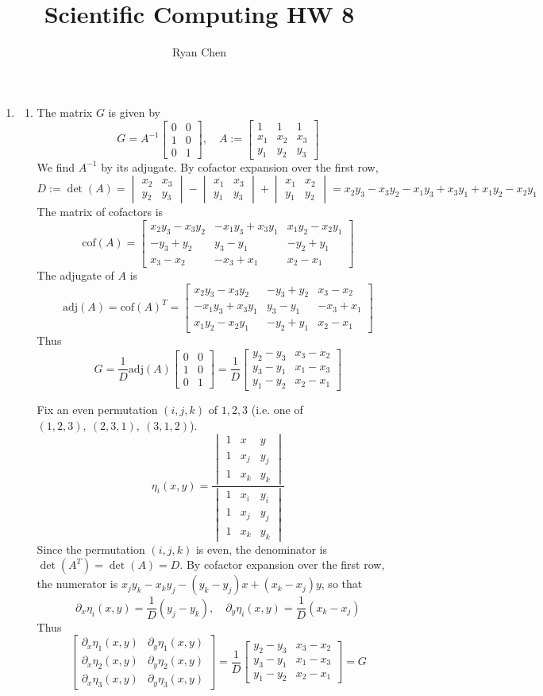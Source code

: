 \documentclass{article}
\title{Scientific Computing HW 8}
\author{Ryan Chen}
\newcommand{\m}[2][b]{\begin{#1matrix}#2\end{#1matrix}}
\newcommand{\inv}{^{-1}}
\newcommand{\ptl}{\partial}
\begin{document}
	
\maketitle



\begin{enumerate}
	


\item

\begin{enumerate}
	
	
	\item The matrix $G$ is given by
	$$G = A\inv \m{0 & 0 \\ 1 & 0 \\ 0 & 1},
	\quad A := \m{1 & 1 & 1 \\ x_1 & x_2 & x_3 \\ y_1 & y_2 & y_3}$$
	We find $A\inv$ by its adjugate. By cofactor expansion over the first row,
	$$D := \det(A)
	= \m[v]{x_2 & x_3 \\ y_2 & y_3} - \m[v]{x_1 & x_3 \\ y_1 & y_3} + \m[v]{x_1 & x_2 \\ y_1 & y_2}
	= x_2y_3 - x_3y_2 - x_1y_3 + x_3y_1 + x_1y_2 - x_2y_1$$
	The matrix of cofactors is
	$$\mathrm{cof}(A) = \m{x_2y_3-x_3y_2 & -x_1y_3+x_3y_1 & x_1y_2-x_2y_1 \\ -y_3+y_2 & y_3-y_1 & -y_2+y_1 \\ x_3-x_2 & -x_3+x_1 & x_2-x_1}$$
	The adjugate of $A$ is
	$$\mathrm{adj}(A) = \mathrm{cof}(A)^T
	= \m{x_2y_3-x_3y_2 & -y_3+y_2  & x_3-x_2 \\ -x_1y_3+x_3y_1& y_3-y_1 & -x_3+x_1 \\ x_1y_2-x_2y_1 & -y_2+y_1 & x_2-x_1}$$
	Thus
	$$G = \frac{1}{D}\mathrm{adj}(A)\m{0 & 0 \\ 1 & 0 \\ 0 & 1}
	= \frac{1}{D}\m{y_2-y_3 & x_3-x_2 \\ y_3-y_1 & x_1-x_3 \\ y_1-y_2 & x_2-x_1}$$
	
	Fix an even permutation $(i,j,k)$ of $1,2,3$ (i.e. one of $(1,2,3),~(2,3,1),~(3,1,2)$).
	$$\eta_i(x,y) = \frac{\m[v]{1 & x & y \\ 1 & x_j & y_j \\ 1 & x_k & y_k}}{\m[v]{1 & x_i & y_i \\ 1 & x_j & y_j \\ 1 & x_k & y_k}}$$
	Since the permutation $(i,j,k)$ is even, the denominator is $\det(A^T)=\det(A)=D$. By cofactor expansion over the first row, the numerator is $x_jy_k - x_ky_j - (y_k - y_j)x + (x_k - x_j)y$, so that
	$$\ptl_x\eta_i(x,y) = \frac{1}{D}(y_j-y_k),
	\quad \ptl_y\eta_i(x,y) = \frac{1}{D}(x_k-x_j)$$
	Thus
	$$\m{\ptl_x\eta_1(x,y) & \ptl_y\eta_1(x,y) \\ \ptl_x\eta_2(x,y) & \ptl_y\eta_2(x,y) \\ \ptl_x\eta_3(x,y) & \ptl_y\eta_3(x,y)}
	= \frac{1}{D}\m{y_2-y_3 & x_3-x_2 \\ y_3-y_1 & x_1-x_3 \\ y_1-y_2 & x_2-x_1}
	= G$$
	

\end{enumerate}
\end{enumerate}
\end{document}
